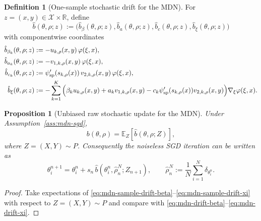 \documentclass[11pt]{article}
\newtheorem{proposition}[theorem]{Proposition}
\theoremstyle{definition}
\newtheorem{definition}[theorem]{Definition}
\newcommand{\R}{\mathbb{R}}
\newcommand{\E}{\mathbb{E}}
\newcommand{\mc}[1]{\mathcal{#1}}
\begin{document}
\begin{definition}[One-sample stochastic drift for the MDN]
\label{def:mdn-sample-drift}
For $z=(x,y)\in\mc{X}\times\R$, define
\[
  \hat b(\theta,\rho;z)
  :=
  \bigl(\hat b_\beta(\theta,\rho;z),\hat b_a(\theta,\rho;z),\hat b_c(\theta,\rho;z),\hat b_\xi(\theta,\rho;z)\bigr)
\]
with componentwise coordinates
\begin{align}
  \hat b_{\beta_k}(\theta,\rho;z)
  &:=
  -
  u_{k,\rho}(x,y)\,\varphi(\xi,x),
  \label{eq:mdn-sample-drift-beta}
  \\
  \hat b_{a_k}(\theta,\rho;z)
  &:=
  -
  v_{1,k,\rho}(x,y)\,\varphi(\xi,x),
  \label{eq:mdn-sample-drift-a}
  \\
  \hat b_{c_k}(\theta,\rho;z)
  &:=
  \psi_{\rm sp}'(s_{k,\rho}(x))\,v_{2,k,\rho}(x,y)\,\varphi(\xi,x),
  \label{eq:mdn-sample-drift-c}
  \\
  \hat b_\xi(\theta,\rho;z)
  &:=
  -
  \sum_{k=1}^K
  \Big(
    \beta_k u_{k,\rho}(x,y)
    +
    a_k v_{1,k,\rho}(x,y)
    -
    c_k\psi_{\rm sp}'(s_{k,\rho}(x))v_{2,k,\rho}(x,y)
  \Big)\nabla_\xi\varphi(\xi,x).
  \label{eq:mdn-sample-drift-xi}
\end{align}
\end{definition}

\begin{proposition}[Unbiased raw stochastic update for the MDN]
\label{prop:mdn-unbiased-sample-drift}
Under Assumption~\ref{ass:mdn-sgd},
\[
  b(\theta,\rho)=\E_Z[\hat b(\theta,\rho;Z)],
\]
where $Z=(X,Y)\sim P$. Consequently the noiseless SGD iteration can be written
as
\begin{equation}
  \theta_i^{n+1}
  =
  \theta_i^n
  +
  s_n\,\hat b(\theta_i^n,\hat\rho_n^N;Z_{n+1}),
  \qquad
  \hat\rho_n^N:=\frac1N\sum_{i=1}^N \delta_{\theta_i^n}.
  \label{eq:mdn-sgd-update}
\end{equation}
\end{proposition}

\begin{proof}
Take expectations of
\eqref{eq:mdn-sample-drift-beta}--\eqref{eq:mdn-sample-drift-xi} with respect
to $Z=(X,Y)\sim P$ and compare with
\eqref{eq:mdn-drift-beta}--\eqref{eq:mdn-drift-xi}.
\end{proof}
\end{document}
